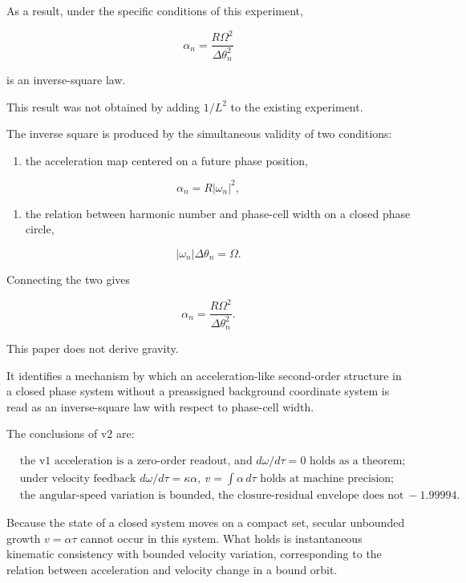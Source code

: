 \documentclass[
  a4paper,
]{article}
\providecommand{\tightlist}{%
  \setlength{\itemsep}{0pt}\setlength{\parskip}{0pt}}
\begin{document}
As a result, under the specific conditions of this experiment,

\[
\alpha_n
=\frac{R\Omega^2}{\Delta\theta_n^2}
\]

is an inverse-square law.

This result was not obtained by adding \(1/L^2\) to the existing
experiment.

The inverse square is produced by the simultaneous validity of two
conditions:

\begin{enumerate}
\def\labelenumi{\arabic{enumi}.}
\tightlist
\item
  the acceleration map centered on a future phase position,
\end{enumerate}

\[
\alpha_n=R|\omega_n|^2,
\]

\begin{enumerate}
\def\labelenumi{\arabic{enumi}.}
\setcounter{enumi}{1}
\tightlist
\item
  the relation between harmonic number and phase-cell width on a closed
  phase circle,
\end{enumerate}

\[
|\omega_n|\Delta\theta_n=\Omega.
\]

Connecting the two gives

\[
\boxed{
\alpha_n
=\frac{R\Omega^2}{\Delta\theta_n^2}
}.
\]

This paper does not derive gravity.

It identifies a mechanism by which an acceleration-like second-order
structure in a closed phase system without a preassigned background
coordinate system is read as an inverse-square law with respect to
phase-cell width.

The conclusions of v2 are:

\[
\boxed{
\begin{aligned}
&\text{the v1 acceleration is a zero-order readout, and }d\omega/d\tau=0\text{ holds as a theorem;}\\
&\text{under velocity feedback }d\omega/d\tau=\kappa\alpha,\ v=\int\alpha\,d\tau\text{ holds at machine precision;}\\
&\text{the angular-speed variation is bounded, the closure-residual envelope does not grow, and the inverse-square law survives with exponent }-1.99994.
\end{aligned}
}
\]

Because the state of a closed system moves on a compact set, secular
unbounded growth \(v=\alpha\tau\) cannot occur in this system. What
holds is instantaneous kinematic consistency with bounded velocity
variation, corresponding to the relation between acceleration and
velocity change in a bound orbit.
\end{document}
